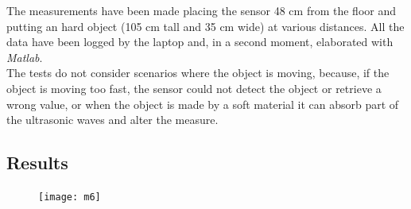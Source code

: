 The measurements have been made placing the sensor 48 cm from the floor and putting an hard object (105 cm tall and 35 cm wide) at various distances. All the data have been logged by the laptop and, in a second moment, elaborated with \textit{Matlab}.\\
The tests do not consider scenarios where the object is moving, because, if the object is moving too fast, the sensor could not detect the object or retrieve a wrong value, or when the object is made by a soft material it can absorb part of the ultrasonic waves and alter the measure. 


\subsection{Results}
\begin{figure}[H]
\texttt{[image: m6]}
\end{figure}


